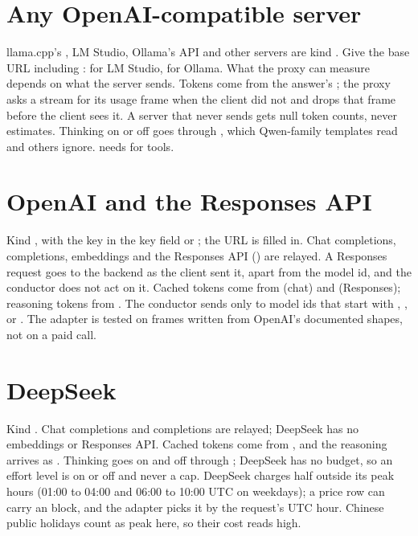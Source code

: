 \section{Any OpenAI-compatible server}

llama.cpp's , LM Studio, Ollama's  API and other servers are kind . Give the base URL including :  for LM Studio,  for Ollama. What the proxy can measure depends on what the server sends. Tokens come from the answer's ; the proxy asks a stream for its usage frame when the client did not and drops that frame before the client sees it. A server that never sends  gets null token counts, never estimates. Thinking on or off goes through , which Qwen-family templates read and others ignore.  needs  for tools.

\section{OpenAI and the Responses API}

Kind , with the key in the key field or ; the URL is filled in. Chat completions, completions, embeddings and the Responses API () are relayed. A Responses request goes to the backend as the client sent it, apart from the model id, and the conductor does not act on it. Cached tokens come from  (chat) and  (Responses); reasoning tokens from . The conductor sends  only to model ids that start with , ,  or . The adapter is tested on frames written from OpenAI's documented shapes, not on a paid call.

\section{DeepSeek}

Kind . Chat completions and completions are relayed; DeepSeek has no embeddings or Responses API. Cached tokens come from , and the reasoning arrives as . Thinking goes on and off through ; DeepSeek has no budget, so an effort level is on or off and never a cap. DeepSeek charges half outside its peak hours (01:00 to 04:00 and 06:00 to 10:00 UTC on weekdays); a price row can carry an  block, and the adapter picks it by the request's UTC hour. Chinese public holidays count as peak here, so their cost reads high.

